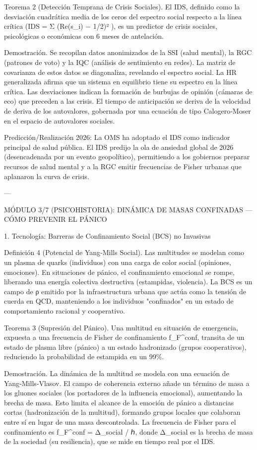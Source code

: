 \documentclass[12pt,twoside]{book}
\begin{document}
Teorema 2 (Detección Temprana de Crisis Sociales). El IDS, definido como la desviación cuadrática media de los ceros del espectro social respecto a la línea crítica (IDS = Σ (Re(s_i) − 1/2)² ), es un predictor de crisis sociales, psicológicas o económicas con 6 meses de antelación.

Demostración. Se recopilan datos anonimizados de la SSI (salud mental), la RGC (patrones de voto) y la IQC (análisis de sentimiento en redes). La matriz de covarianza de estos datos se diagonaliza, revelando el espectro social. La HR generalizada afirma que un sistema en equilibrio tiene su espectro en la línea crítica. Las desviaciones indican la formación de burbujas de opinión (cámaras de eco) que preceden a las crisis. El tiempo de anticipación se deriva de la velocidad de deriva de los autovalores, gobernada por una ecuación de tipo Calogero‑Moser en el espacio de autovalores sociales.

Predicción/Realización 2026: La OMS ha adoptado el IDS como indicador principal de salud pública. El IDS predijo la ola de ansiedad global de 2026 (desencadenada por un evento geopolítico), permitiendo a los gobiernos preparar recursos de salud mental y a la RGC emitir frecuencias de Fisher urbanas que aplanaron la curva de crisis.

---

MÓDULO 3/7 (PSICOHISTORIA): DINÁMICA DE MASAS CONFINADAS — CÓMO PREVENIR EL PÁNICO

1. Tecnología: Barreras de Confinamiento Social (BCS) no Invasivas

Definición 4 (Potencial de Yang‑Mills Social). Las multitudes se modelan como un plasma de quarks (individuos) con una carga de color social (opiniones, emociones). En situaciones de pánico, el confinamiento emocional se rompe, liberando una energía colectiva destructiva (estampidas, violencia). La BCS es un campo de ρ emitido por la infraestructura urbana que actúa como la tensión de cuerda en QCD, manteniendo a los individuos "confinados" en un estado de comportamiento racional y cooperativo.

Teorema 3 (Supresión del Pánico). Una multitud en situación de emergencia, expuesta a una frecuencia de Fisher de confinamiento f_F^conf, transita de un estado de plasma libre (pánico) a un estado hadronizado (grupos cooperativos), reduciendo la probabilidad de estampida en un 99\%.

Demostración. La dinámica de la multitud se modela con una ecuación de Yang‑Mills‑Vlasov. El campo de coherencia externo añade un término de masa a los gluones sociales (los portadores de la influencia emocional), aumentando la brecha de masa. Esto limita el alcance de la emoción de pánico a distancias cortas (hadronización de la multitud), formando grupos locales que colaboran entre sí en lugar de una masa descontrolada. La frecuencia de Fisher para el confinamiento es f_F^conf = Δ_social / ℎ, donde Δ_social es la brecha de masa de la sociedad (su resiliencia), que se mide en tiempo real por el IDS.
\end{document}
